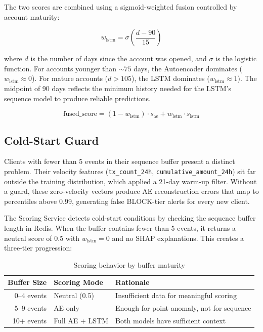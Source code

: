 The two scores are combined using a sigmoid-weighted fusion controlled by
account maturity:

\[
w_{\text{lstm}} = \sigma\!\left(\frac{d - 90}{15}\right)
\]

where $d$ is the number of days since the account was opened, and $\sigma$ is
the logistic function. For accounts younger than ${\sim}75$ days, the
Autoencoder dominates ($w_{\text{lstm}} \approx 0$). For mature accounts
($d > 105$), the LSTM dominates ($w_{\text{lstm}} \approx 1$). The midpoint
of 90 days reflects the minimum history needed for the LSTM's sequence model
to produce reliable predictions.

\[
\text{fused\_score} = (1 - w_{\text{lstm}}) \cdot s_{\text{ae}}
                    + w_{\text{lstm}} \cdot s_{\text{lstm}}
\]

\subsection{Cold-Start Guard}

Clients with fewer than 5 events in their sequence buffer present a distinct
problem. Their velocity features (\texttt{tx\_count\_24h},
\texttt{cumulative\_amount\_24h}) sit far outside the training distribution,
which applied a 21-day warm-up filter. Without a guard, these zero-velocity
vectors produce AE reconstruction errors that map to percentiles above 0.99,
generating false BLOCK-tier alerts for every new client.

The Scoring Service detects cold-start conditions by checking the sequence
buffer length in Redis. When the buffer contains fewer than 5 events, it
returns a neutral score of 0.5 with $w_{\text{lstm}} = 0$ and no SHAP
explanations. This creates a three-tier progression:

\begin{table}[H]
\centering
\caption{Scoring behavior by buffer maturity}
\label{tab:cold-start-ch5}
\begin{tabular}{@{}rll@{}}
\toprule
\textbf{Buffer Size} & \textbf{Scoring Mode} & \textbf{Rationale} \\
\midrule
0--4 events  & Neutral (0.5)    & Insufficient data for meaningful scoring \\
5--9 events  & AE only          & Enough for point anomaly, not for sequence \\
10+ events   & Full AE + LSTM   & Both models have sufficient context \\
\bottomrule
\end{tabular}
\end{table}

